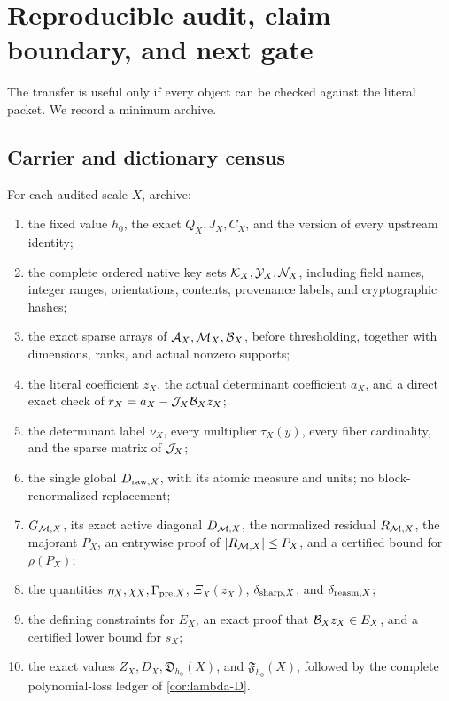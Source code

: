 \section{Reproducible audit, claim boundary, and next gate}
\label{sec:audit}

The transfer is useful only if every object can be checked against the
literal packet.  We record a minimum archive.

\subsection{Carrier and dictionary census}

For each audited scale \(X\), archive:
\begin{enumerate}[label=(A\arabic*),leftmargin=2.7em]
\item the fixed value \(h_0\), the exact \(Q_X,J_X,C_X\), and the
version of every upstream identity;
\item the complete ordered native key sets
\(\mathcal K_X,\mathcal Y_X,\mathcal N_X\), including field names, integer ranges,
orientations, contents, provenance labels, and cryptographic hashes;
\item the exact sparse arrays of \(\mathcal A_X,\mathcal M_X,\mathcal B_X\), before
thresholding, together with dimensions, ranks, and actual nonzero
supports;
\item the literal coefficient \(z_X\), the actual determinant
coefficient \(a_X\), and a direct exact check of
\(r_X=a_X-\mathcal J_X\mathcal B_Xz_X\);
\item the determinant label \(\nu_X\), every multiplier
\(\tau_X(y)\), every fiber cardinality, and the sparse matrix of
\(\mathcal J_X\);
\item the single global \(D_{{\rm raw},X}\), with its atomic measure
and units; no block-renormalized replacement;
\item \(G_{\mathcal M,X}\), its exact active diagonal
\(D_{\mathcal M,X}\), the normalized residual \(R_{\mathcal M,X}\), the majorant
\(P_X\), an entrywise proof of \(|R_{\mathcal M,X}|\le P_X\), and a certified
bound for \(\rho(P_X)\);
\item the quantities \(\eta_X,\chi_X,\Gamma_{{\rm pre},X}\),
\(\Xi_X(z_X)\), \(\delta_{{\rm sharp},X}\), and
\(\delta_{{\rm reasm},X}\);
\item the defining constraints for \(E_X\), an exact proof that
\(\mathcal B_Xz_X\in E_X\), and a certified lower bound for \(s_X\);
\item the exact values \(Z_X,D_X,\mathfrak D_{h_0}(X)\), and
\(\mathfrak F_{h_0}(X)\), followed by the complete polynomial-loss
ledger of \cref{cor:lambda-D}.
\end{enumerate}

